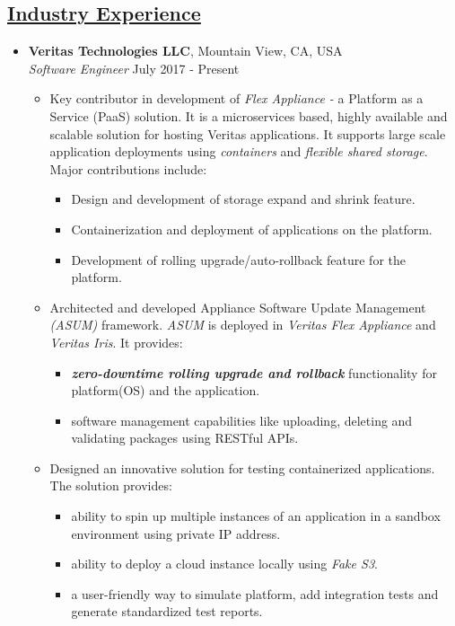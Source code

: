 \documentclass[10pt]{article}
\begin{document}
\subsection*{\underline{Industry Experience}}
\vspace{-0.1cm}
\begin{itemize}[leftmargin=0.15in]
\item {\bfseries Veritas Technologies LLC}, Mountain View, CA, USA \\
{\sl Software Engineer}  \hfill July 2017 - Present
\vspace{-0.15cm}
\begin{itemize}
\setlength{\itemsep}{0.4em}%
\item Key contributor in development of \textit{Flex Appliance -} a Platform as a Service (PaaS) solution. It is a microservices based, highly available and scalable solution for hosting Veritas applications. It supports large scale application deployments using \textit{containers} and \textit{flexible shared storage}. Major contributions include:
\begin{itemize}
\item Design and development of storage expand and shrink feature.
\item Containerization and deployment of applications on the platform.
\item Development of rolling upgrade/auto-rollback feature for the platform.
\end{itemize}

\item Architected and developed Appliance Software Update Management \textit{(ASUM)} framework. \textit{ASUM} is deployed in \textit{Veritas Flex Appliance} and \textit{Veritas Iris}. It provides:
\begin{itemize}
\item \textbf{\textit {zero-downtime rolling upgrade and rollback}} functionality for platform(OS) and the application.
\item software management capabilities like uploading, deleting and validating packages using RESTful APIs.
\end{itemize}

\item Designed an innovative solution for testing containerized applications. The solution provides:
\begin{itemize}
\item ability to spin up multiple instances of an application in a sandbox environment using private IP address.
\item ability to deploy a cloud instance locally using \textit{Fake S3}.
\item a user-friendly way to simulate platform, add integration tests and generate standardized test reports.
\end{itemize}


\end{itemize}
\end{itemize}
\end{document}
